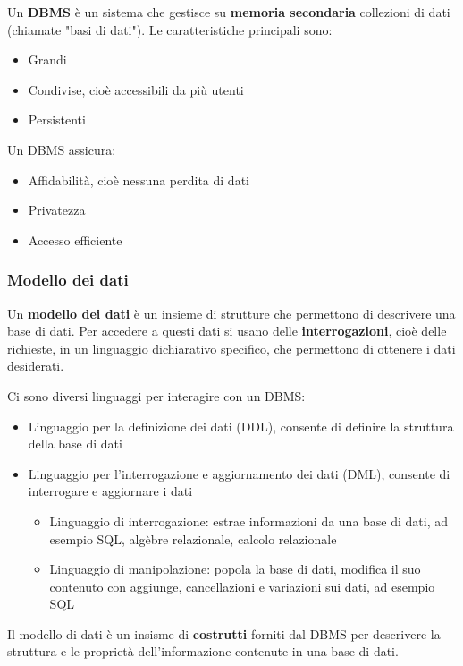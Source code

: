 \documentclass[a4paper,twoside]{article}
\begin{document}
\begin{definition}
  Un \textbf{DBMS} è un sistema che gestisce su \textbf{memoria secondaria} collezioni
  di dati (chiamate "basi di dati"). Le caratteristiche principali sono:
  \begin{itemize}
    \item Grandi
    \item Condivise, cioè accessibili da più utenti
    \item Persistenti
  \end{itemize}
  Un DBMS assicura:
  \begin{itemize}
    \item Affidabilità, cioè nessuna perdita di dati
    \item Privatezza
    \item Accesso efficiente
  \end{itemize}
\end{definition}

\subsubsection{Modello dei dati}
Un \textbf{modello dei dati} è un insieme di strutture che permettono di descrivere
una base di dati. Per accedere a questi dati si usano delle \textbf{interrogazioni},
cioè delle richieste, in un linguaggio dichiarativo specifico, che permettono di ottenere
i dati desiderati.

Ci sono diversi linguaggi per interagire con un DBMS:
\begin{itemize}
  \item Linguaggio per la definizione dei dati (DDL), consente di definire la struttura
    della base di dati
  \item Linguaggio per l'interrogazione e aggiornamento dei dati (DML), consente
    di interrogare e aggiornare i dati
    \begin{itemize}
      \item Linguaggio di interrogazione: estrae informazioni da una base di dati,
        ad esempio SQL, algèbre relazionale, calcolo relazionale
      \item Linguaggio di manipolazione: popola la base di dati, modifica il suo contenuto
        con aggiunge, cancellazioni e variazioni sui dati, ad esempio SQL
    \end{itemize}
\end{itemize}

Il modello di dati è un insisme di \textbf{costrutti} forniti dal DBMS per descrivere la
struttura e le proprietà dell'informazione contenute in una base di dati.
\end{document}
